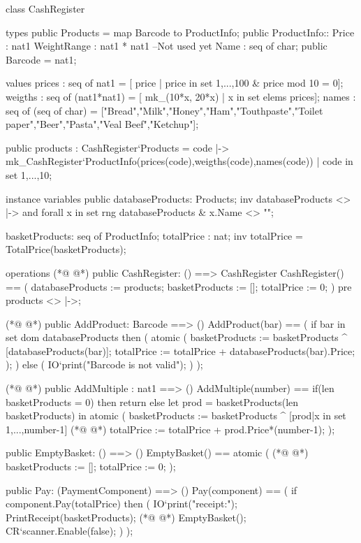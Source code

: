\begin{vdmpp}
class CashRegister

types
 public Products = map Barcode to ProductInfo;
 public ProductInfo::  Price : nat1
            WeightRange : nat1 * nat1 --Not used yet
            Name : seq of char;
 public Barcode = nat1;

values
 prices : seq of nat1 = [ price | price in set {1,...,100} & price mod 10 = 0];
 weigths : seq of (nat1*nat1) = [ mk_(10*x, 20*x) | x in set elems prices];
 names : seq of (seq of char) = ["Bread","Milk","Honey","Ham","Touthpaste","Toilet paper","Beer","Pasta","Veal Beef","Ketchup"];
 
 public products : CashRegister`Products = {code |-> mk_CashRegister`ProductInfo(prices(code),weigths(code),names(code)) 
          | code in set {1,...,10}}; 
 
instance variables
 public databaseProducts: Products;
  inv databaseProducts <> {|->} and 
   forall x in set rng databaseProducts &
    x.Name <> "";
   
 basketProducts: seq of ProductInfo;
 totalPrice : nat;
  inv totalPrice = TotalPrice(basketProducts); 
 
operations
(*@
\label{CashRegister:29}
@*)
 public CashRegister: () ==> CashRegister
 CashRegister() ==
  (
   databaseProducts := products;
   basketProducts := [];
   totalPrice := 0;
  )
  pre products <> {|->};

(*@
\label{AddProduct:38}
@*)
 public AddProduct: Barcode ==> ()
 AddProduct(bar) ==
  (
   if bar in set dom databaseProducts then
   (
    atomic
    (
     basketProducts := basketProducts ^ [databaseProducts(bar)];
     totalPrice := totalPrice + databaseProducts(bar).Price;
    );
   )
   else 
   (
    IO`print("Barcode is not valid\n");
   )
  );

(*@
\label{AddMultiple:55}
@*)
 public AddMultiple : nat1 ==> ()
 AddMultiple(number) == 
  if(len basketProducts = 0) then 
   return
  else
   let prod = basketProducts(len basketProducts) 
    in  
     atomic
     (
       basketProducts := basketProducts ^ [prod|x in set {1,...,number-1}]
(*@
\label{EmptyBasket:65}
@*)
       totalPrice := totalPrice + prod.Price*(number-1);
     );
 

 public EmptyBasket: () ==> ()
 EmptyBasket() ==
  atomic
  (
(*@
\label{Pay:73}
@*)
   basketProducts := [];
   totalPrice := 0;
  );
  
 public Pay: (PaymentComponent) ==> ()
 Pay(component) ==
  (
   if component.Pay(totalPrice) then
   (
    IO`print("\nPayment receipt:\n");
    PrintReceipt(basketProducts);
(*@
\label{PrintReceipt:84}
@*)
    EmptyBasket();
    CR`scanner.Enable(false);
   )
  );
  

\end{vdmpp}

